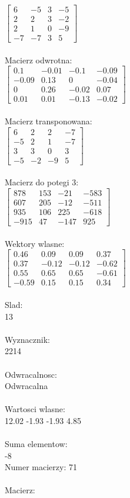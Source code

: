 \documentclass[a4paper,12pt]{article}
\begin{document}
$\begin{bmatrix} 6&-5&3&-5\\2&2&3&-2\\2&1&0&-9\\-7&-7&3&5 \end{bmatrix}$
\\
\\
Macierz odwrotna:\\

$\begin{bmatrix} 0.1&-0.01&-0.1&-0.09\\-0.09&0.13&0&-0.04\\0&0.26&-0.02&0.07\\0.01&0.01&-0.13&-0.02 \end{bmatrix}$
\\
\\
Macierz transponowana:\\

$\begin{bmatrix} 6&2&2&-7\\-5&2&1&-7\\3&3&0&3\\-5&-2&-9&5 \end{bmatrix}$
\\
\\
Macierz do potegi 3:\\

$\begin{bmatrix} 878&153&-21&-583\\607&205&-12&-511\\935&106&225&-618\\-915&47&-147&925 \end{bmatrix}$
\\
\\
Wektory wlasne:\\

$\begin{bmatrix} 0.46&0.09&0.09&0.37\\0.37&-0.12&-0.12&-0.62\\0.55&0.65&0.65&-0.61\\-0.59&0.15&0.15&0.34 \end{bmatrix}$
\\
\\
Slad:\\
13
\\
\\
Wyznacznik:\\
2214
\\
\\
Odwracalnosc:\\
Odwracalna
\\
\\
Wartosci wlasne:\\
12.02 -1.93 -1.93 4.85
\\
\\
Suma elementow:\\
-8
\\
\newpage
Numer macierzy:
71
\\
\\
Macierz:\\
\end{document}
